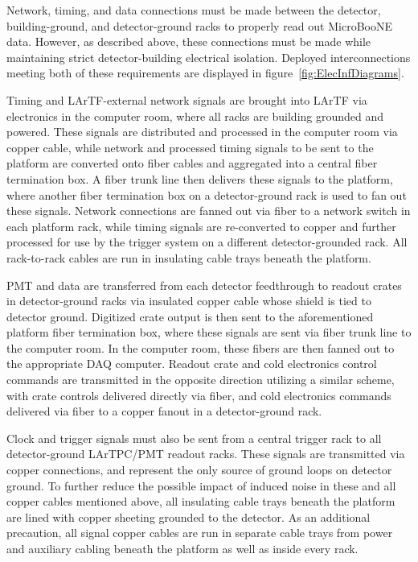 Network, timing, and data connections must be made between the detector, building-ground, and detector-ground racks to properly read out MicroBooNE data.  However, as described above, these connections must be made while maintaining strict detector-building electrical isolation.  Deployed interconnections meeting both of these requirements are displayed in figure~\ref{fig:ElecInfDiagrams}.

Timing and LArTF-external network signals are brought into LArTF via electronics in the computer room, where all racks are building grounded and powered.  These signals are distributed and processed in the computer room via copper cable, while network and processed timing signals to be sent to the platform are converted onto fiber cables and aggregated into a central fiber termination box.  A fiber trunk line then delivers these signals to the platform, where another fiber termination box on a detector-ground rack is used to fan out these signals.  Network connections are fanned out via fiber to a network switch in each platform rack, while timing signals are re-converted to copper and further processed for use by the trigger system on a different detector-grounded rack.  All rack-to-rack cables are run in insulating cable trays beneath the platform.

PMT and \lartpc data are transferred from each detector feedthrough to readout crates in detector-ground racks via insulated copper cable whose shield is tied to detector ground.  Digitized crate output is then sent to the aforementioned platform fiber termination box, where these signals are sent via fiber trunk line to the computer room.  In the computer room, these fibers are then fanned out to the appropriate DAQ computer.  Readout crate and cold electronics control commands are transmitted in the opposite direction utilizing a similar scheme, with crate controls delivered directly via fiber, and cold electronics commands delivered via fiber to a copper fanout in a detector-ground rack.

Clock and trigger signals must also be sent from a central trigger rack to all detector-ground LArTPC/PMT readout racks.  These signals are transmitted via copper connections, and represent the only source of ground loops on detector ground.  To further reduce the possible impact of induced noise in these and all copper cables mentioned above, all insulating cable trays beneath the platform are lined with copper sheeting grounded to the detector.  As an additional precaution, all \lartpc signal copper cables are run in separate cable trays from power and auxiliary cabling beneath the platform as well as inside every rack.

